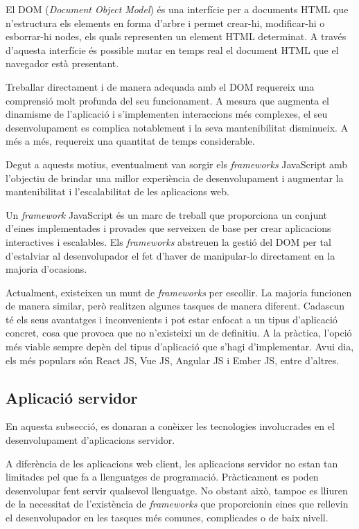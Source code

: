 \documentclass[a4paper,12pt]{ThesisStyle}
\begin{document}
El DOM (\textit{Document Object Model}) és una interfície per a documents HTML que n'estructura els elements en forma d'arbre i permet crear-hi, modificar-hi o esborrar-hi nodes, els quals representen un element HTML determinat. A través d'aquesta interfície és possible mutar en temps real el document HTML que el navegador està presentant.

Treballar directament i de manera adequada amb el DOM requereix una comprensió molt profunda del seu funcionament. A mesura que augmenta el dinamisme de l'aplicació i s'implementen interaccions més complexes, el seu desenvolupament es complica notablement i la seva mantenibilitat disminueix. A més a més, requereix una quantitat de temps considerable.

Degut a aquests motius, eventualment van sorgir els \textit{frameworks} JavaScript amb l'objectiu de brindar una millor experiència de desenvolupament i augmentar la mantenibilitat i l'escalabilitat de les aplicacions web.

Un \textit{framework} JavaScript és un marc de treball que proporciona un conjunt d'eines implementades i provades que serveixen de base per crear aplicacions interactives i escalables. Els \textit{frameworks} abstreuen la gestió del DOM per tal d'estalviar al desenvolupador el fet d'haver de manipular-lo directament en la majoria d'ocasions.

Actualment, existeixen un munt de \textit{frameworks} per escollir. La majoria funcionen de manera similar, però realitzen algunes tasques de manera diferent. Cadascun té els seus avantatges i inconvenients i pot estar enfocat a un tipus d'aplicació concret, cosa que provoca que no n'existeixi un de definitiu. A la pràctica, l'opció més viable sempre depèn del tipus d'aplicació que s'hagi d'implementar. Avui dia, els més populars són React JS, Vue JS, Angular JS i Ember JS, entre d'altres.

\subsection{Aplicació servidor}

En aquesta subsecció, es donaran a conèixer les tecnologies involucrades en el desenvolupament d'aplicacions servidor.

A diferència de les aplicacions web client, les aplicacions servidor no estan tan limitades pel que fa a llenguatges de programació. Pràcticament es poden desenvolupar fent servir qualsevol llenguatge. No obstant això, tampoc es lliuren de la necessitat de l'existència de \textit{frameworks} que proporcionin eines que rellevin el desenvolupador en les tasques més comunes, complicades o de baix nivell.
\end{document}
